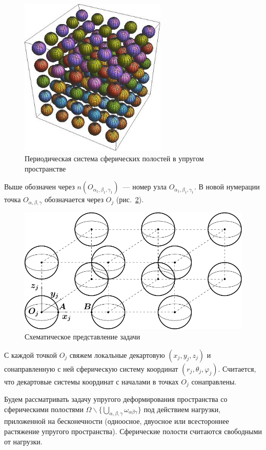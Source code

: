 \begin{figure}[h!]
\centering
\includegraphics[width=7cm]{cav-125.jpg}
\caption{Периодическая система сферических полостей в упругом пространстве}
\label{f:11:1f}
\end{figure}

Выше обозначен через $n(O_{\alpha_1,\beta_1,\gamma_1})$~--- номер узла $O_{\alpha_1,\beta_1,\gamma_1}$. В новой нумерации точка $O_{\alpha,\beta,\gamma}$ обозначается через $O_j$ (рис.~\ref{f:11:1}).

\begin{figure}[h!]
\centering
\includegraphics[width=12cm]{cartesian-spheres-periodic.pdf}
\caption{Схематическое представление задачи}
\label{f:11:1}
\end{figure}

С каждой точкой $O_j$ свяжем локальные декартовую $(x_j,y_j,z_j)$ и сонаправленную с ней сферическую систему координат $(r_j,\theta_j,\varphi_j)$. Считается, что декартовые системы координат с началами в точках $O_j$ сонаправлены.

Будем рассматривать задачу упругого деформирования пространства со сферическими полостями $\Omega\backslash\bigg\{\bigcup\limits_{\alpha,\beta,\gamma}\omega_{\alpha\beta\gamma}\bigg\}$ под действием нагрузки, приложенной на бесконечности (одноосное, двуосное или всестороннее растяжение упругого пространства). Сферические полости считаются свободными от нагрузки.

